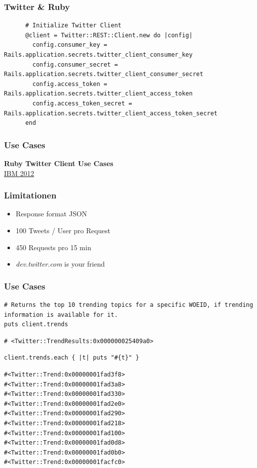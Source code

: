 \documentclass{beamer}
\begin{document}
\begin{frame}[fragile]
  \frametitle{Twitter \& Ruby}
    \begin{lstlisting}
      # Initialize Twitter Client
      @client = Twitter::REST::Client.new do |config|
        config.consumer_key = Rails.application.secrets.twitter_client_consumer_key
        config.consumer_secret = Rails.application.secrets.twitter_client_consumer_secret
        config.access_token = Rails.application.secrets.twitter_client_access_token
        config.access_token_secret = Rails.application.secrets.twitter_client_access_token_secret
      end
    \end{lstlisting}    
\end{frame}
\begin{frame}
  \frametitle{Use Cases}\pause
  \begin{center}
    \textbf{Ruby Twitter Client Use Cases}\\
    \hyperlink{http://www.ibm.com/developerworks/library/os-dataminingrubytwitter}{IBM 2012}\pause
  \end{center}
\end{frame}

\begin{frame}
  \frametitle{Limitationen}
  \begin{itemize}
    \item Response format JSON
    \item 100 Tweets / User pro Request
    \item 450 Requests pro 15 min 
    \item \textit{dev.twitter.com} is your friend
  \end{itemize}
\end{frame}

\begin{frame}[fragile]
  \frametitle{Use Cases}
  \begin{lstlisting}
# Returns the top 10 trending topics for a specific WOEID, if trending information is available for it.
puts client.trends
\end{lstlisting}\pause
\begin{lstlisting}
# <Twitter::TrendResults:0x000000025409a0>
\end{lstlisting}\pause
\begin{lstlisting}
client.trends.each { |t| puts "#{t}" }
\end{lstlisting}\pause
\begin{lstlisting}
#<Twitter::Trend:0x00000001fad3f8>
#<Twitter::Trend:0x00000001fad3a8>
#<Twitter::Trend:0x00000001fad330>
#<Twitter::Trend:0x00000001fad2e0>
#<Twitter::Trend:0x00000001fad290>
#<Twitter::Trend:0x00000001fad218>
#<Twitter::Trend:0x00000001fad100>
#<Twitter::Trend:0x00000001fad0d8>
#<Twitter::Trend:0x00000001fad0b0>
#<Twitter::Trend:0x00000001facfc0>
\end{lstlisting}
\end{frame}
\end{document}
